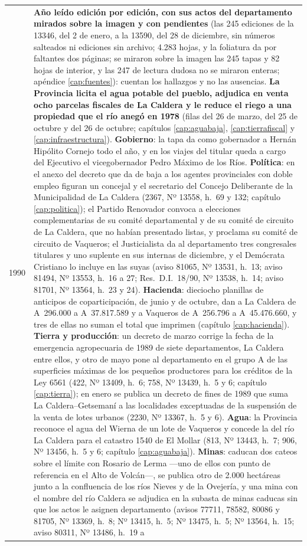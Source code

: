\begin{longtable}{@{}p{2.7cm}p{10.3cm}@{}}
1990 & \textbf{Año leído edición por edición, con sus actos del departamento mirados sobre la imagen y con pendientes} (las 245 ediciones de la 13346, del 2 de enero, a la 13590, del 28 de diciembre, sin números salteados ni ediciones sin archivo; 4.283 hojas, y la foliatura da por faltantes dos páginas; se miraron sobre la imagen las 245 tapas y 82 hojas de interior, y las 247 de lectura dudosa no se miraron enteras; apéndice \ref{cap:fuentes}): cuentan los hallazgos y no las ausencias. \textbf{La Provincia licita el agua potable del pueblo, adjudica en venta ocho parcelas fiscales de La Caldera y le reduce el riego a una propiedad que el río anegó en 1978} (filas del 26 de marzo, del 25 de octubre y del 26 de octubre; capítulos \ref{cap:aguabaja}, \ref{cap:tierrafiscal} y \ref{cap:infraestructura}). \textbf{Gobierno}: la tapa da como gobernador a Hernán Hipólito Cornejo todo el año, y en los viajes del titular queda a cargo del Ejecutivo el vicegobernador Pedro Máximo de los Ríos. \textbf{Política}: en el anexo del decreto que da de baja a los agentes provinciales con doble empleo figuran un concejal y el secretario del Concejo Deliberante de la Municipalidad de La Caldera (2367, Nº 13558, h.\ 69 y 132; capítulo \ref{cap:politica}); el Partido Renovador convoca a elecciones complementarias de su comité departamental y de su comité de circuito de La Caldera, que no habían presentado listas, y proclama su comité de circuito de Vaqueros; el Justicialista da al departamento tres congresales titulares y uno suplente en sus internas de diciembre, y el Demócrata Cristiano lo incluye en las suyas (aviso 81065, Nº 13531, h.\ 13; aviso 81494, Nº 13553, h.\ 16 a 27; Res.\ D.I.\ 18/90, Nº 13538, h.\ 14; aviso 81701, Nº 13564, h.\ 23 y 24). \textbf{Hacienda}: dieciocho planillas de anticipos de coparticipación, de junio y de octubre, dan a La Caldera de A~296.000 a A~37.817.589 y a Vaqueros de A~256.796 a A~45.476.660, y tres de ellas no suman el total que imprimen (capítulo \ref{cap:hacienda}). \textbf{Tierra y producción}: un decreto de marzo corrige la fecha de la emergencia agropecuaria de 1989 de siete departamentos, La Caldera entre ellos, y otro de mayo pone al departamento en el grupo A de las superficies máximas de los pequeños productores para los créditos de la Ley 6561 (422, Nº 13409, h.\ 6; 758, Nº 13439, h.\ 5 y 6; capítulo \ref{cap:tierra}); en enero se publica un decreto de fines de 1989 que suma La Caldera--Getsemaní a las localidades exceptuadas de la suspensión de la venta de lotes urbanos (2230, Nº 13367, h.\ 5 y 6). \textbf{Agua}: la Provincia reconoce el agua del Wierna de un lote de Vaqueros y concede la del río La Caldera para el catastro 1540 de El Mollar (813, Nº 13443, h.\ 7; 906, Nº 13456, h.\ 5 y 6; capítulo \ref{cap:aguabaja}). \textbf{Minas}: caducan dos cateos sobre el límite con Rosario de Lerma ---uno de ellos con punto de referencia en el Alto de Volcán---, se publica otro de 2.000 hectáreas junto a la confluencia de los ríos Nieves y de la Ovejería, y una mina con el nombre del río Caldera se adjudica en la subasta de minas caducas sin que los actos le asignen departamento (avisos 77711, 78582, 80086 y 81705, Nº 13369, h.\ 8; Nº 13415, h.\ 5; Nº 13475, h.\ 5; Nº 13564, h.\ 15; aviso 80311, Nº 13486, h.\ 19 a 
\end{longtable}
